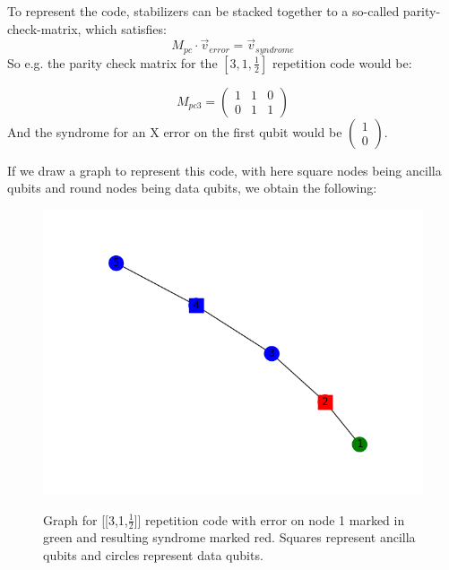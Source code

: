 To represent the code, stabilizers can be stacked together to
a so-called parity-check-matrix, which satisfies:
\begin{equation}\label{eq: pcm}
	M_{pc}\cdot \vec{v}_{error} = \vec{v}_{syndrome}
\end{equation}
So e.g. the parity check matrix for the $[3,1,\frac{1}{2}]$
repetition code would be:

\begin{equation}
	M_{pc3} = \left( 
	\begin{array}{ccc}
		1 & 1 & 0 \\
		0 & 1 & 1
	\end{array}
	\right)
\end{equation}
And the syndrome for an X error on the first qubit would be
$\left(\begin{array}{c}1\\0\end{array}\right)$.

If we draw a graph to represent this code, with here square nodes being
 ancilla qubits
and round nodes being data qubits, we obtain the following:

\begin{figure}[h!]
	\begin{center}
	\captionsetup{justification=centering,margin=2cm}
	\includegraphics[scale=0.4]{./img/figures/rep_3_graph.png}\\
	\caption{Graph for [[3,1,$\frac{1}{2}$]] repetition code with error on
    node 1 marked in green and resulting syndrome marked red.
    Squares represent ancilla qubits and circles represent data qubits.}
        
	\label{fig: rep_graph}
	\end{center}
\end{figure}
